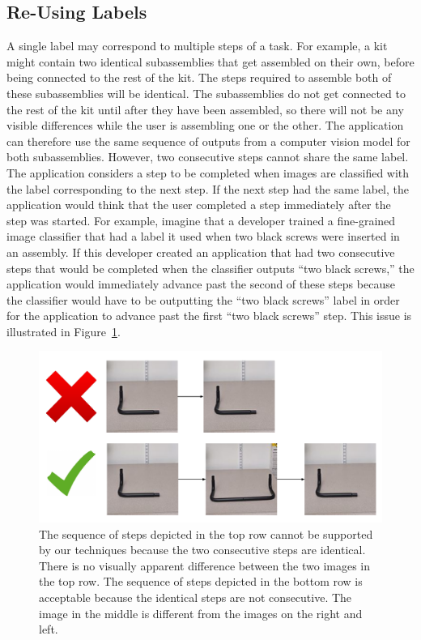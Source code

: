 \subsection{Re-Using Labels}

A single label may correspond to multiple steps of a task.
For example, a kit might contain two identical subassemblies that get assembled
on their own, before being connected to the rest of the kit.
The steps required to assemble both of these subassemblies will be identical.
The subassemblies do not get connected to the rest of the kit until after they
have been assembled, so there will not be any visible differences while the user
is assembling one or the other.
The application can therefore use the same sequence of outputs from a computer
vision model for both subassemblies.
However, two consecutive steps cannot share the same label.
The application considers a step to be completed when images are classified with
the label corresponding to the next step.
If the next step had the same label, the application would think that the user
completed a step immediately after the step was started.
For example, imagine that a developer trained a fine-grained image classifier
that had a label it used when two black screws were inserted in an assembly.
If this developer created an application that had two consecutive steps that
would be completed when the classifier outputs ``two black screws,'' the
application would immediately advance past the second of these steps because
the classifier would have to be outputting the ``two black screws'' label in
order for the application to advance past the first ``two black screws'' step.
This issue is illustrated in Figure~\ref{fig:consec_step}.

\begin{figure}
  \includegraphics[width=\columnwidth]{figures/consec_step.pdf}
  \caption{
    The sequence of steps depicted in the top row cannot be supported by our
    techniques because the two consecutive steps are identical.
    There is no visually apparent difference between the two images in the top
    row.
    The sequence of steps depicted in the bottom row is acceptable because the
    identical steps are not consecutive.
    The image in the middle is different from the images on the right and left.
  }\label{fig:consec_step}
\end{figure}

